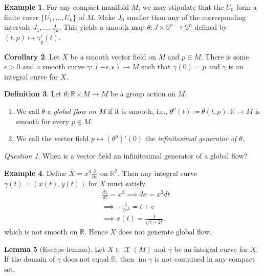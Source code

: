 \documentclass[10pt,letterpaper,cm]{nupset}
\theoremstyle{definition}
\newtheorem{definition}{Definition}[subsection]
\newtheorem{exmp}[definition]{Example}
\theoremstyle{theorem}
\newtheorem{lemma}[definition]{Lemma}
\newtheorem{corollary}[definition]{Corollary}
\theoremstyle{remark}
\newtheorem*{question}{Question}
\newcommand{\R}{\mathbb R}
\renewcommand{\S}{\mathbb S}
\newcommand{\1}{\mathbf{1}}
\newcommand{\0}{\vec 0}
\DeclareMathOperator{\im}{im}
\DeclareMathOperator{\vf}{\mathscr{X}}
\begin{document}
\begin{exmp}
For any compact manifold $M$, we may stipulate that the $U_0$ form a finite cover $\{U_1, \ldots, U_k\}$ of $M$. Make $J_0$ smaller than any of the corresponding intervals $J_1, \ldots, J_k$. This yields a smooth map $\theta : J \times \S^n \to \S^n$ defined by $(t, p) \mapsto \gamma_p^i(t)$.
\end{exmp}

\begin{corollary}
Let $X$ be a smooth vector field on $M$ and $p\in M$. There is some $\epsilon >0$ and a smooth curve $\gamma : (-\epsilon , \epsilon) \to M$ such that $\gamma(0)= p$ and $\gamma$ is an integral curve for $X$.
\end{corollary}

\begin{definition}
Let $\theta : \R \times M \to M$ be a group action on $M$. 
\begin{enumerate}
\item We call $\theta$ a \textit{global flow on $M$} if it is smooth, i.e., $\theta^p(t)\coloneqq  \theta(t, p) : \R \to M$ is smooth for every $p\in M$.
\item We call the vector field $p\mapsto  (\theta^p)'(0)$  the \textit{infinitesimal generator of $\theta$}.
\end{enumerate}
\end{definition}

\begin{question}
When is a vector field an infinitesimal generator of  a global flow?
\end{question}

\begin{exmp}
Define $X = x^3\frac{\partial}{\partial{x}}$ on $\R^2$. Then any integral curve $\gamma (t) = \left(x(t), y(t)\right)$ for $X$ must satisfy
\begin{align*}
& \frac{dx}{dt} = x^3
 \implies  dx = x^3dt
\\ & \implies {-\frac{1}{2x^2}} = t+c
\\ & \implies x(t) = \frac{1}{\sqrt{c-2t}},
\end{align*}
which is not smooth on $\R$. Hence $X$ does not generate global flow.
\end{exmp}

\begin{lemma}[Escape lemma]
Let $X \in \vf(M)$ and $\gamma$ be an integral curve for $X$. If the domain of $\gamma$ does not equal $\R$, then $\im \gamma$ is not contained in any compact set.
\end{lemma}
\end{document}
